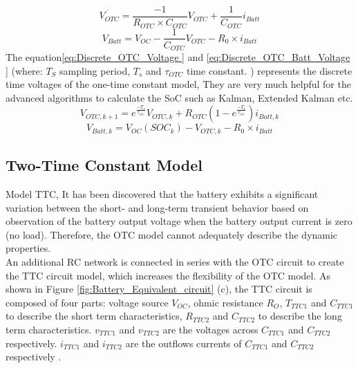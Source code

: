 \begin{equation}\label{eq:OTC_Voltage }
    \dot{ V_{OTC}} = \frac{-1}{R_{OTC}\times C_{OTC}} V_{OTC} + \frac{1}{C_{OTC}} i_{Batt}
\end{equation}
\begin{equation}\label{eq:OTC_Batt_Voltage }
    V_{Batt} = V_{OC} -  \frac{1}{C_{OTC}} V_{OTC} - R_{0}\times i_{Batt}
\end{equation}
The equation\ref{eq:Discrete_OTC_Voltage } and \ref{eq:Discrete_OTC_Batt_Voltage } (where: $T_S$ sampling period, $T_s$ and $\tau_{OTC}$  time constant. ) represents the discrete time voltages of the one-time constant model, They are very much helpful for the advanced algorithms to calculate the SoC such as Kalman, Extended Kalman etc.
\begin{equation}\label{eq:Discrete_OTC_Voltage }
    V_{OTC,k+1} = e^{\frac{-T_{s}}{\tau_{otc}}} V_{OTC,k} + R_{OTC}\left(1- e^{\frac{-T_{s}}{\tau_{otc}}}\right) i_{Batt,k}
\end{equation}
\begin{equation}\label{eq:Discrete_eOTC_Batt_Voltage }
    V_{Batt,k} = V_{OC}(SOC_{k}) -  V_{OTC,k} - R_{0}\times i_{Batt}
\end{equation}

\subsection{Two-Time Constant Model }
Model TTC, It has been discovered that the battery exhibits a significant variation between the short- and long-term transient behavior based on observation of the battery output voltage when the battery output current is zero (no load). Therefore, the OTC model cannot adequately describe the dynamic properties.
\\
An additional RC network is connected in series with the OTC circuit to create the TTC circuit model, which increases the flexibility of the OTC model.
As shown in Figure \ref{fig:Battery_Equivalent_circuit} (c), the TTC circuit is 
composed of four parts: voltage source $V_{OC}$, ohmic 
resistance $R_{O}$, $T_{TTC1}$ and $C_{TTC1}$ to describe the short term 
characteristics, $R_{TTC2}$ and $C_{TTC2}$ to describe the long term 
characteristics. $v_{TTC1}$ and $v_{TTC2}$ are the voltages across $C_{TTC1}$
and $C_{TTC2}$ respectively\cite{UKEMPT_AHMAD2012}. $i_{TTC1}$ and $i_{TTC2}$ are the outflows 
currents of $C_{TTC1}$ and $C_{TTC2}$ respectively \cite{UniPadua_Giacomo}. 

